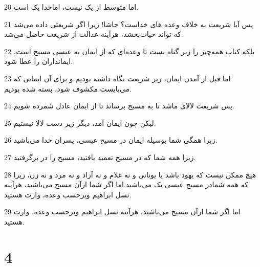 \par 20 اما متوسط از یک نیست، اماخدا یک است.
\par 21 پس آیا شریعت به خلاف وعده های خداست؟ حاشا! زیرا اگر شریعتی داده می‌شد که تواند حیات‌بخشد، هرآینه عدالت از شریعت حاصل می‌شد.
\par 22 بلکه کتاب همه‌چیز را زیر گناه بست تا وعده‌ای که از ایمان به عیسی مسیح است، ایمانداران را عطا شود.
\par 23 اما قبل از آمدن ایمان، زیر شریعت نگاه داشته بودیم و برای آن ایمانی که می‌بایست مکشوف شود، بسته شده بودیم.
\par 24 پس شریعت لالای ماشد تا به مسیح برساند تا از ایمان عادل شمرده شویم.
\par 25 لیکن چون ایمان آمد، دیگر زیر دست لالا نیستیم.
\par 26 زیرا همگی شما بوسیله ایمان در مسیح عیسی، پسران خدا می‌باشید.
\par 27 زیرا همه شما که در مسیح تعمید یافتید، مسیح را در بر‌گرفتید.
\par 28 هیچ ممکن نیست که یهود باشد یا یونانی و نه غلام و نه آزاد و نه مرد و نه زن، زیرا که همه شمادر مسیح عیسی یک می‌باشید.اما اگر شما ازآن مسیح می‌باشید، هرآینه نسل ابراهیم وبرحسب وعده، وارث هستید.
\par 29 اما اگر شما ازآن مسیح می‌باشید، هرآینه نسل ابراهیم وبرحسب وعده، وارث هستید.

\chapter{4}

